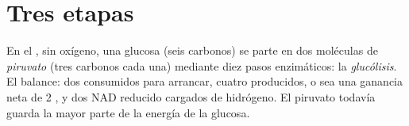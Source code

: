 \section{Tres etapas}

\begin{proposition}[La glucólisis]\label{prop:g12:respiration-fermentation:glycolysis}
En el , sin oxígeno, una glucosa (seis carbonos) se parte en
dos moléculas de \emph{piruvato} (tres carbonos cada una) mediante diez
pasos enzimáticos: la \emph{glucólisis}. El balance:
dos  consumidos para arrancar, cuatro producidos, o sea una ganancia
neta de 2 , y dos NAD reducido cargados de hidrógeno. El piruvato
todavía guarda la mayor parte de la energía de la glucosa.
\end{proposition}
\admitted

